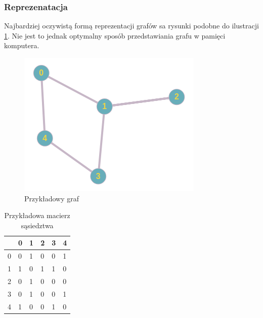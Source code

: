 \documentclass{classrep}
\begin{document}
\subsubsection{Reprezenatacja}
Najbardziej oczywistą formą reprezentacji grafów sa rysunki podobne do ilustracji \ref{example:graph}.
Nie jest to jednak optymalny sposób przedstawiania grafu w pamięci komputera. 
\begin{table}[H]
    \begin{minipage}[b]{0.45\linewidth}\centering
        \begin{figure}[H]
            \includegraphics[width=\textwidth]{graf.png}
            \caption{Przykładowy graf}
            \label{example:graph}
        \end{figure}
    \end{minipage}
    \hspace{0.5cm}
    \begin{minipage}[b]{0.45\linewidth}
    \centering
    \begin{tabular}{|l|lllll}
        \hline
         & \multicolumn{1}{l|}{0} & \multicolumn{1}{l|}{1} & \multicolumn{1}{l|}{2} & \multicolumn{1}{l|}{3} & \multicolumn{1}{l|}{4} \\ \hline
        0 & 0 & 1 & 0 & 0 & 1 \\ \cline{1-1}
        1 & 1 & 0 & 1 & 1 & 0 \\ \cline{1-1}
        2 & 0 & 1 & 0 & 0 & 0 \\ \cline{1-1}
        3 & 0 & 1 & 0 & 0 & 1 \\ \cline{1-1}
        4 & 1 & 0 & 0 & 1 & 0 \\ \cline{1-1}
        \end{tabular}
        \caption{Przykładowa macierz sąsiedztwa}
        \label{example:table}
    \end{minipage}
    \end{table}
\end{document}
